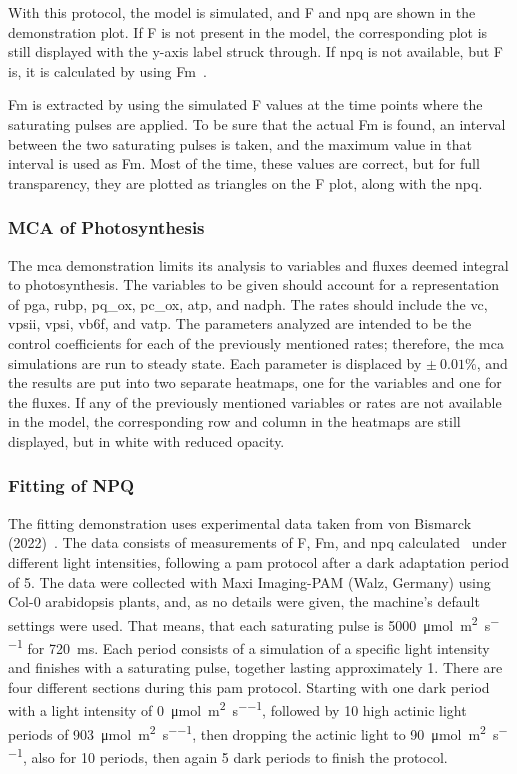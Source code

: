 With this protocol, the model is simulated, and \gls{F} and \gls{npq} are shown in the demonstration plot. If \gls{F} is not present in the model, the corresponding plot is still displayed with the y-axis label struck through. If \gls{npq} is not available, but \gls{F} is, it is calculated by using \gls{Fm}~.

\gls{Fm} is extracted by using the simulated \gls{F} values at the time points where the saturating pulses are applied. To be sure that the actual \gls{Fm} is found, an interval between the two saturating pulses is taken, and the maximum value in that interval is used as \gls{Fm}. Most of the time, these values are correct, but for full transparency, they are plotted as triangles on the \gls{F} plot, along with the \gls{npq}.
\subsubsection{MCA of Photosynthesis}
The \gls{mca} demonstration limits its analysis to variables and fluxes deemed integral to photosynthesis. The variables to be given should account for a representation of \gls{pga}, \gls{rubp}, \gls{pq_ox}, \gls{pc_ox}, \gls{atp}, and \gls{nadph}. The rates should include the \gls{vc}, \gls{vpsii}, \gls{vpsi}, \gls{vb6f}, and \gls{vatp}. The parameters analyzed are intended to be the control coefficients for each of the previously mentioned rates; therefore, the \gls{mca} simulations are run to steady state. Each parameter is displaced by $\pm \ 0.01 \%$, and the results are put into two separate heatmaps, one for the variables and one for the fluxes. If any of the previously mentioned variables or rates are not available in the model, the corresponding row and column in the heatmaps are still displayed, but in white with reduced opacity.

\subsubsection{Fitting of NPQ}
The fitting demonstration uses experimental data taken from von Bismarck (2022)~\cite{vonbismarckLightAcclimationInteracts2023}. The data consists of measurements of \gls{F}, \gls{Fm}, and \gls{npq} calculated~ under different light intensities, following a \gls{pam} protocol after a dark adaptation period of \qty{5}{\min}. The data were collected with Maxi Imaging-PAM (Walz, Germany) using Col-0 \gls{arabidopsis} plants, and, as no details were given, the machine's default settings were used. That means, that each saturating pulse is \qty{5000}{\micro\mol\per\square\meter\per\second} for \qty{720}{\milli\second}. Each period consists of a simulation of a specific light intensity and finishes with a saturating pulse, together lasting approximately \qty{1}{\min}. There are four different sections during this \gls{pam} protocol. Starting with one dark period with a light intensity of \qty{0}{\micro\mol\per\square\meter\per\second}, followed by 10 high actinic light periods of \qty{903}{\micro\mol\per\square\meter\per\second}, then dropping the actinic light to \qty{90}{\micro\mol\per\square\meter\per\second}, also for 10 periods, then again 5 dark periods to finish the protocol.

